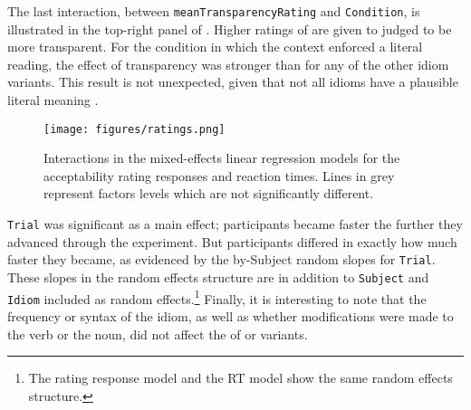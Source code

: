 \documentclass[output=paper
,modfonts
,nonflat]{langsci/langscibook}
\begin{document}


The last interaction, between \texttt{meanTransparencyRating} and \texttt{Condition}, is illustrated in the top-right panel of . Higher ratings of  are given to  judged to be more transparent.  For the condition in which the context enforced a literal  reading, the effect of transparency was stronger than for any of the other idiom variants.  This result is not unexpected, given that not all idioms have a plausible literal meaning \citep{TitoneConnine1994}. 


\begin{figure}
\centering
\texttt{[image: figures/ratings.png]}
\caption{Interactions in the mixed-effects linear regression models for the acceptability rating responses and reaction times. Lines in grey represent factors levels which are not significantly different.}
\label{plotRatings}
\end{figure}


\texttt{Trial} was significant as a main effect; participants became faster the further they advanced through the experiment. But participants differed in exactly how much faster they became, as evidenced by the by-Subject random slopes for \texttt{Trial}. These slopes in the random effects structure are in addition to \texttt{Subject} and \texttt{Idiom} included as random effects.\footnote{The rating response model and the RT model show the same random effects structure.} Finally, it is interesting to note that the frequency or syntax of the idiom, as well as whether modifications were made to the verb or the noun, did not affect the  of  or variants. 
\end{document}
